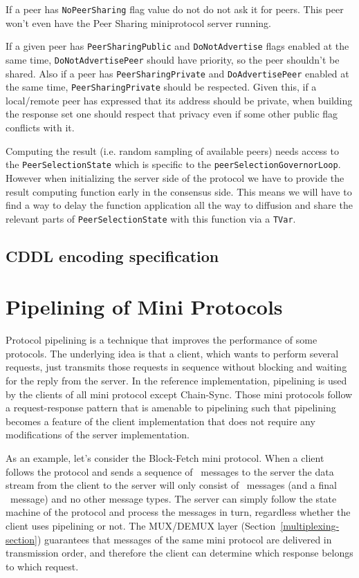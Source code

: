 If a peer has \texttt{NoPeerSharing} flag value do not do not ask it for peers. This peer
won't even have the Peer Sharing miniprotocol server running.

If a given peer has \texttt{PeerSharingPublic} and \texttt{DoNotAdvertise} flags enabled
at the same time, \texttt{DoNotAdvertisePeer} should have priority, so the peer shouldn't
be shared. Also if a peer has \texttt{PeerSharingPrivate} and \texttt{DoAdvertisePeer}
enabled at the same time, \texttt{PeerSharingPrivate} should be respected. Given this, if
a local/remote peer has expressed that its address should be private, when building the
response set one should respect that privacy even if some other public flag conflicts with
it.

Computing the result (i.e. random sampling of available peers) needs access to the
\texttt{PeerSelectionState} which is specific to the \texttt{peerSelectionGovernorLoop}. However when
initializing the server side of the protocol we have to provide the result computing
function early in the consensus side. This means we will have to find a way to delay the
function application all the way to diffusion and share the relevant parts of
\texttt{PeerSelectionState} with this function via a \texttt{TVar}.

\subsection{CDDL encoding specification}


\section{Pipelining of Mini Protocols}
\label{pipelining}
Protocol pipelining is a technique that improves the performance of some protocols.
The underlying idea is that a client, which wants to perform several requests,
just transmits those requests in sequence without blocking and waiting for the reply from the server.
In the reference implementation, pipelining is used by the clients of all mini protocol except Chain-Sync.
Those mini protocols follow a request-response pattern that is amenable to pipelining such
that pipelining becomes a feature of the client implementation that does not require any
modifications of the server implementation.

As an example, let's consider the Block-Fetch mini protocol.
When a client follows the protocol and sends a sequence of \MsgRequestRange~messages to the server
the data stream from the client to the server will only consist of \MsgRequestRange~messages
(and a final \MsgClientDone~message) and no other message types.
The server can simply follow the state machine of the protocol and process the messages in turn,
regardless whether the client uses pipelining or not.
The MUX/DEMUX layer (Section~\ref{multiplexing-section}) guarantees
that messages of the same mini protocol are delivered in transmission order,
and therefore the client can determine which response belongs to which request.

